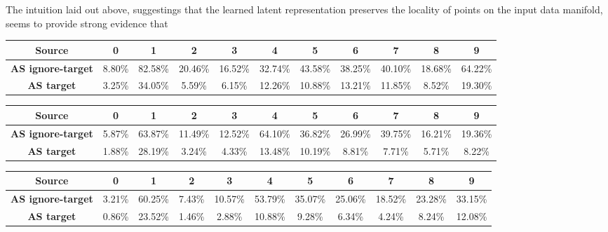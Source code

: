 \documentclass{report}
\begin{document}
The intuition laid out above, suggestings that the learned latent representation preserves the locality of points on the input data manifold, seems to provide strong evidence that 


\begin{center}
{\tiny
  \begin{tabular}{|c|c|c|c|c|c|c|c|c|c|c|}
  \hline
  \textbf{Source} & \textbf{0} & \textbf{1} & \textbf{2} & \textbf{3} & \textbf{4} & \textbf{5} & \textbf{6} & \textbf{7} & \textbf{8} & \textbf{9}  \\ \hline
  \textbf{AS ignore-target} & 8.80\% & 82.58\% & 20.46\% & 16.52\% & 32.74\% & 43.58\% & 38.25\% & 40.10\% & 18.68\% & 64.22\% \\ \hline
  \textbf{AS target} & 3.25\% & 34.05\% & 5.59\% & 6.15\% & 12.26\% & 10.88\% & 13.21\% & 11.85\% & 8.52\% & 19.30\% \\ \hline
  \end{tabular}
}
\end{center}

\begin{center}
{\tiny
  \begin{tabular}{|c|c|c|c|c|c|c|c|c|c|c|}
  \hline
  \textbf{Source} & \textbf{0} & \textbf{1} & \textbf{2} & \textbf{3} & \textbf{4} & \textbf{5} & \textbf{6} & \textbf{7} & \textbf{8} & \textbf{9}  \\ \hline
  \textbf{AS ignore-target} & 5.87\% & 63.87\% & 11.49\% & 12.52\% & 64.10\% & 36.82\% & 26.99\% & 39.75\% & 16.21\% & 19.36\% \\ \hline
  \textbf{AS target} & 1.88\% & 28.19\% & 3.24\% & 4.33\% & 13.48\% & 10.19\% & 8.81\% & 7.71\% & 5.71\% & 8.22\% \\ \hline
  \end{tabular}
}
\end{center}

\begin{center}
{\tiny
  \begin{tabular}{|c|c|c|c|c|c|c|c|c|c|c|}
  \hline
  \textbf{Source} & \textbf{0} & \textbf{1} & \textbf{2} & \textbf{3} & \textbf{4} & \textbf{5} & \textbf{6} & \textbf{7} & \textbf{8} & \textbf{9}  \\ \hline
  \textbf{AS ignore-target} & 3.21\% & 60.25\% & 7.43\% & 10.57\% & 53.79\% & 35.07\% & 25.06\% & 18.52\% & 23.28\% & 33.15\% \\ \hline
  \textbf{AS target} & 0.86\% & 23.52\% & 1.46\% & 2.88\% & 10.88\% & 9.28\% & 6.34\% & 4.24\% & 8.24\% & 12.08\% \\ \hline
  \end{tabular}
}
\end{center}
\end{document}
